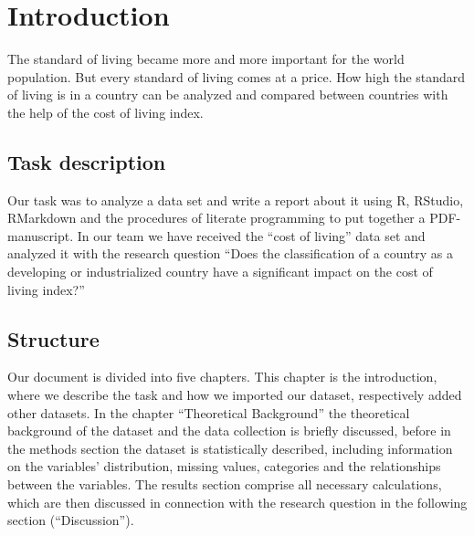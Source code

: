 \documentclass[
  11pt,
  a4paper,
  twoside]{scrbook}
\begin{document}
{
\setcounter{tocdepth}{3}

{}

\tableofcontents
\newpage
}


\renewcommand{\cftfignumwidth}{6em}
\renewcommand{\cftfigpresnum}{Fig. }
{}
\listoffigures
\newpage



\setcounter{page}{1}

\doublespacing

\hypertarget{introduction}{%
\chapter{Introduction}\label{introduction}}

The standard of living became more and more important for the world population. But every standard of living comes at a price. How high the standard of living is in a country can be analyzed and compared between countries with the help of the cost of living index.

\hypertarget{task-description}{%
\section{Task description}\label{task-description}}

Our task was to analyze a data set and write a report about it using R, RStudio, RMarkdown and the procedures of literate programming to put together a PDF-manuscript.
In our team we have received the ``cost of living'' data set and analyzed it with the research question ``Does the classification of a country as a developing or industrialized country have a significant impact on the cost of living index?''

\hypertarget{structure}{%
\section{Structure}\label{structure}}

Our document is divided into five chapters. This chapter is the introduction, where we describe the task and how we imported our dataset, respectively added other datasets.
In the chapter ``Theoretical Background'' the theoretical background of the dataset and the data collection is briefly discussed, before in the methods section the dataset is statistically described, including information on the variables' distribution, missing values,
categories and the relationships between the variables.
The results section comprise all necessary calculations, which are then discussed in connection with the research question in the following section (``Discussion'').
\end{document}
